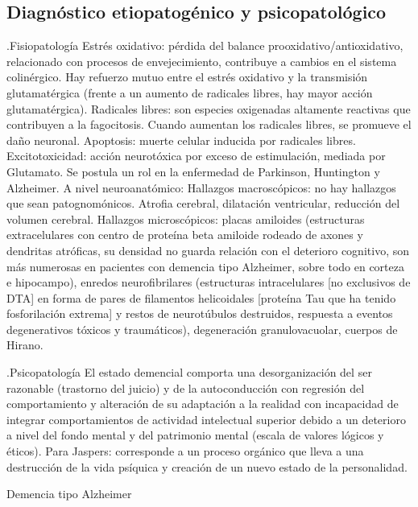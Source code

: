 \subsection*{Diagnóstico etiopatogénico y psicopatológico}
.Fisiopatología
Estrés oxidativo: pérdida del balance prooxidativo/antioxidativo, relacionado con procesos de envejecimiento, contribuye a cambios en el sistema colinérgico. Hay refuerzo mutuo entre el estrés oxidativo y la transmisión glutamatérgica (frente a un aumento de radicales libres, hay mayor acción glutamatérgica). Radicales libres: son especies oxigenadas altamente reactivas que contribuyen a la fagocitosis. Cuando aumentan los radicales libres, se promueve el daño neuronal. Apoptosis: muerte celular inducida por radicales libres. Excitotoxicidad: acción neurotóxica por exceso de estimulación, mediada por Glutamato. Se postula un rol en la enfermedad de Parkinson, Huntington y Alzheimer. A nivel neuroanatómico: Hallazgos macroscópicos: no hay hallazgos que sean patognomónicos. Atrofia cerebral, dilatación ventricular, reducción del volumen cerebral. Hallazgos microscópicos: placas amiloides (estructuras extracelulares con centro de proteína beta amiloide rodeado de axones y dendritas atróficas, su densidad no guarda relación con el deterioro cognitivo, son más numerosas en pacientes con demencia tipo Alzheimer, sobre todo en corteza e hipocampo), enredos neurofibrilares (estructuras intracelulares [no exclusivos de DTA] en forma de pares de filamentos helicoidales [proteína Tau que ha tenido fosforilación extrema] y restos de neurotúbulos destruidos, respuesta a eventos degenerativos tóxicos y traumáticos), degeneración granulovacuolar, cuerpos de Hirano.

.Psicopatología
El estado demencial comporta una desorganización del ser razonable (trastorno del juicio) y de la autoconducción con regresión del comportamiento y alteración de su adaptación a la realidad con incapacidad de integrar comportamientos de actividad intelectual superior debido a un deterioro a nivel del fondo mental y del patrimonio mental (escala de valores lógicos y éticos). Para Jaspers: corresponde a un proceso orgánico que lleva a una destrucción de la vida psíquica y creación de un nuevo estado de la personalidad.

Demencia tipo Alzheimer

